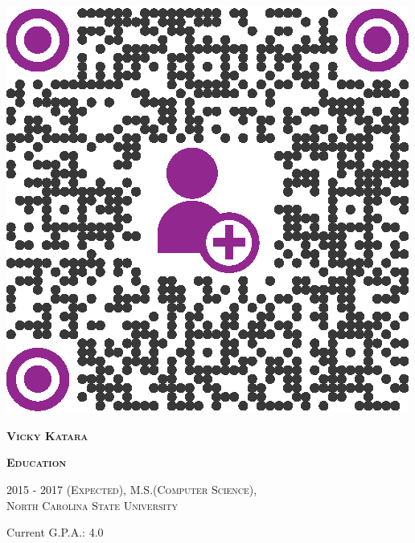 \documentclass[letterpaper,12pt,final]{memoir}
\newcommand{\Sep}{\vspace{1.5em}}
\newcommand{\SmallSep}{\vspace{0.5em}}
\newenvironment{Objective}
	{\ignorespaces\textbf{\color{Black} Objective}}
	{\Sep\ignorespacesafterend}
\newcommand{\CVSection}[1]
	{\Large\textbf{\textsc{{#1}}}\par
	\SmallSep\normalsize\normalfont}
\newcommand{\CVItem}[1]
	{\textsc{\color{Black} #1}}
\begin{document}
\SmallSep
	\hspace{0.7cm}
		\vspace{-0.35cm}
	\textsc{\bfseries{\color{Black}{Save My Contact}}}\\\\
	\vspace{+0.45cm}
	\includegraphics[width=0.8\columnwidth]{qrcode_2.eps}
\framebreak

\Huge\bfseries \textsc{\color{Black} Vicky Katara}
\SmallSep

\normalsize\normalfont


\CVSection{Education}
\CVItem{2015 - 2017 (Expected), M.S.(Computer Science),\\ North \hyphenchar\font=-1 Carolina State University}\\
\begin{footnotesize}
	Current G.P.A.: 4.0
\end{footnotesize}
\SmallSep
\end{document}
